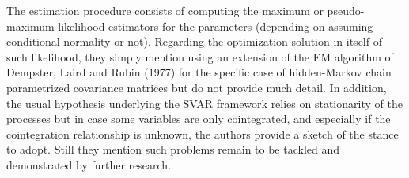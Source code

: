 \bigbreak

The estimation procedure consists of computing the maximum or pseudo-maximum likelihood estimators for the parameters (depending on assuming conditional normality or not). 
Regarding the optimization solution in itself  of such likelihood, they simply mention using an extension of the EM algorithm of Dempster, Laird and Rubin (1977) for the specific case of hidden-Markov chain parametrized covariance matrices but do not provide much detail. %
In addition, the usual hypothesis underlying the SVAR framework relies on stationarity of the processes but in case some variables are only cointegrated, and especially if the cointegration relationship is unknown, the authors provide a sketch of the stance to adopt. 
Still they mention such problems remain to be tackled and demonstrated by further research.

\bigbreak

